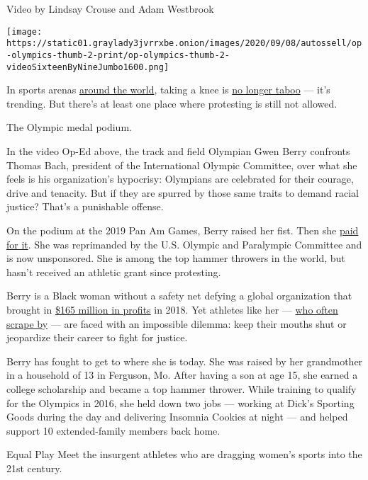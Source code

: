 Video by Lindsay Crouse and Adam Westbrook

\texttt{[image: https://static01.graylady3jvrrxbe.onion/images/2020/09/08/autossell/op-olympics-thumb-2-print/op-olympics-thumb-2-videoSixteenByNineJumbo1600.png]}

In sports arenas
\href{https://www.skysports.com/football/news/12016/12062572/black-lives-matter-england-players-to-take-a-knee-in-nations-league-games}{around
the world}, taking a knee is
\href{https://www.cbsnews.com/news/kneeling-athletes-anthem-opinion-poll-28-07-2020/}{no
longer taboo} --- it's trending. But there's at least one place where
protesting is still not allowed.

The Olympic medal podium.

In the video Op-Ed above, the track and field Olympian Gwen Berry
confronts Thomas Bach, president of the International Olympic Committee,
over what she feels is his organization's hypocrisy: Olympians are
celebrated for their courage, drive and tenacity. But if they are
spurred by those same traits to demand racial justice? That's a
punishable offense.

On the podium at the 2019 Pan Am Games, Berry raised her fist. Then she
\href{https://www.cbc.ca/sports/george-floyd-athlete-protest-gwen-berry-1.5593346}{paid
for it}. She was reprimanded by the U.S. Olympic and Paralympic
Committee and is now unsponsored. She is among the top hammer throwers
in the world, but hasn't received an athletic grant since protesting.

Berry is a Black woman without a safety net defying a global
organization that brought in
\href{https://www.sportbusiness.com/news/ioc-reports-healthy-profit-in-winter-olympics-year/}{\$165
million in profits} in 2018. Yet athletes like her ---
\href{https://www.fastcompany.com/3062575/olympic-athletes-struggle-financially-while-striving-for-gold}{who
often scrape by} --- are faced with an impossible dilemma: keep their
mouths shut or jeopardize their career to fight for justice.

Berry has fought to get to where she is today. She was raised by her
grandmother in a household of 13 in Ferguson, Mo. After having a son at
age 15, she earned a college scholarship and became a top hammer
thrower. While training to qualify for the Olympics in 2016, she held
down two jobs --- working at Dick's Sporting Goods during the day and
delivering Insomnia Cookies at night --- and helped support 10
extended-family members back home.

Equal Play Meet the insurgent athletes who are dragging women's sports
into the 21st century.

